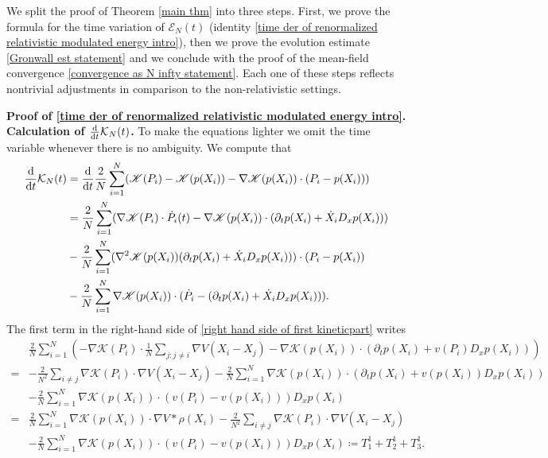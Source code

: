 \documentclass[11pt,reqno]{amsart}
\numberwithin{equation}{section}
\def\dd{{\rm d}}
\begin{document}
We split the proof of Theorem \ref{main thm} into three steps. First, we prove the formula for the time variation of $\mathcal{E}_{N}(t)$ (identity \eqref{time der of renormalized relativistic modulated energy intro}), then we prove the evolution estimate \eqref{Gronwall est statement} and we conclude with the proof of the mean-field convergence \eqref{convergence as N  infty statement}. Each one of these steps reflects nontrivial adjustments in comparison to the non-relativistic settings.  

\vspace{0.4 cm}

\textbf{Proof of \ref{time der of renormalized relativistic modulated energy intro}.}
\textbf{Calculation of $\frac{\dd}{\dd t}\mathcal{K}_{N}(t)$.}
To make the equations lighter we omit the time variable whenever there is no ambiguity. We compute that 
\begin{align}
\frac{\dd}{\dd t}\mathcal{K}_{N}(t)&=\frac{\dd}{\dd t}\frac{2}{N}\sum_{i=1}^{N}(\mathscr{K}(P_{i})-\mathscr{K}(p(X_{i}))-\nabla \mathscr{K}(p(X_{i}))\cdot(P_{i}-p(X_{i}))) \notag\\
&=\frac{2}{N}\sum_{i=1}^{N}(\nabla \mathscr{K}(P_{i})\cdot \dot{P}_{i}(t)-\nabla\mathscr{K}(p(X_{i}))\cdot (\partial_{t}p(X_{i})+\dot X_{i}D_{x}p(X_{i}))) \notag\\
&-\frac{2}{N}\sum_{i=1}^{N}(\nabla ^{2}\mathscr{K}(p(X_{i}))(\partial_{t}p(X_{i})+\dot{X}_{i}D_{x}p(X_{i})))\cdot (P_{i}-p(X_{i})) \notag\\
&-\frac{2}{N}\sum_{i=1}^{N}\nabla \mathscr{K}(p(X_{i}))\cdot (\dot{P}_{i}-(\partial_{t}p(X_{i})+\dot{X}_{i}D_{x}p(X_{i}))). \label{right hand side of first kineticpart}
\end{align}
The first term in the right-hand side of \eqref{right hand side of first kineticpart} writes 
\begin{align*}
&\frac{2}{N}\sum_{i=1}^{N}\left(-\nabla \mathscr{K}(P_{i})\cdot \frac{1}{N}\sum_{j:j\neq i}\nabla V(X_{i}-X_{j})-\nabla \mathscr{K}(p(X_{i}))\cdot(\partial_{t}p(X_{i})+v(P_{i})D_{x}p(X_{i}))\right)\\
=&-\frac{2}{N^{2}}\sum_{i\neq j}\nabla \mathscr{K}(P_{i})\cdot \nabla V(X_{i}-X_{j})-\frac{2}{N}\sum_{i=1}^{N}\nabla \mathscr{K}(p(X_{i}))\cdot (\partial_{t}p(X_{i})+v(p(X_{i}))D_{x}p(X_{i}))\\
&-\frac{2}{N}\sum_{i=1}^{N}\nabla \mathscr{K}(p(X_{i}))\cdot (v(P_{i})-v(p(X_{i})))D_{x}p(X_{i})\\
=& \frac{2}{N}\sum_{i=1}^{N}\nabla \mathscr{K}(p(X_{i}))\cdot \nabla V\ast \rho(X_{i})-\frac{2}{N^{2}}\sum_{i\neq j}\nabla \mathscr{K}(P_{i})\cdot \nabla V(X_{i}-X_{j})\\
&-\frac{2}{N}\sum_{i=1}^{N}\nabla \mathscr{K}(p(X_{i}))\cdot (v(P_{i})-v(p(X_{i})))D_{x}p(X_{i})\coloneqq T_{1}^{1}+T_{2}^{1}+T_{3}^{1}. 
\end{align*}
\end{document}
